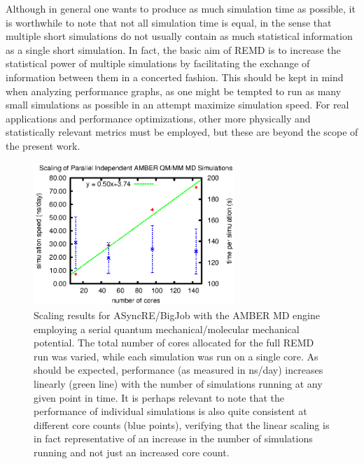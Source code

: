 Although in general one wants to produce as much simulation time as possible, 
it is worthwhile to note that not all simulation time is equal, in the sense 
that multiple short simulations do not usually contain as much statistical 
information as a single short simulation. In fact, the basic aim of REMD is to
increase the statistical power of multiple simulations by facilitating the
exchange of information between them in a concerted fashion. This should be
kept in mind when analyzing performance graphs, as one might be tempted to run
as many small simulations as possible in an attempt maximize simulation speed.
For real applications and performance optimizations, other more physically and
statistically relevant metrics must be employed, but these are beyond the
scope of the present work.

\begin{figure}
\includegraphics[width=3in]{amber_data/qmmm.eps}
\caption{
  Scaling results for ASyncRE/BigJob with the AMBER MD engine employing a
  serial quantum mechanical/molecular mechanical potential. The total number
  of cores allocated for the full REMD run was varied, while each simulation
  was run on a single core. As should be expected, performance (as measured in
  ns/day) increases linearly (green line) with the number of simulations 
  running at any given point in time. It is perhaps relevant to note that the
  performance of individual simulations is also quite consistent at different
  core counts (blue points), verifying that the linear scaling is in fact
  representative of an increase in the number of simulations running and not
  just an increased core count.
  \label{fig:amber_qmmm}  
}
\end{figure}


